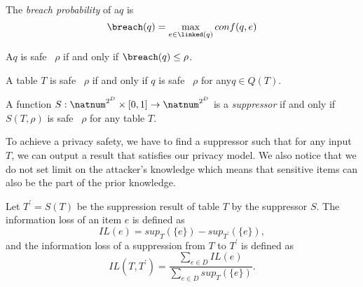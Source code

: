 \begin{definition}
\label{def:probability} The \emph{breach probability} of a\qid $q$ is \[
\breach(q) = \max_{e\in\linked(q)} conf(q,e) \]
\end{definition}

\begin{definition}%
\label{def:safety_qid}
A\qid $q$ is safe \wrt~$\rho$ if and only if $\breach(q)\leq\rho$.
\end{definition}

\begin{definition}%
\label{def:safety_table}
A table $T$ is safe \wrt~$\rho$ if and only if $q$ is safe \wrt~$\rho$ for any\qid $q\in Q(T)$.
\end{definition}

\begin{definition}[Suppressor]
\label{def:suppressor}
A function $S : \natnum^{2^D}\times[0,1]\rightarrow\natnum^{2^D}$ is a \emph{suppressor} if and only if $S(T,\rho)$ is safe \wrt~$\rho$ for any table $T$.
\end{definition}

To achieve a privacy safety, we have to find a suppressor such that for any input $T$, we can output a result
that satisfies our privacy model. We also notice that we do not set limit on the attacker's knowledge which means that
 sensitive items can also be the part of the prior knowledge.
 
 


\begin{definition}
\label{def:infoloss}
Let $T^\prime = S(T)$ be the suppression result of table $T$ by the suppressor $S$.
The information loss of an item $e$ is defined as
\[ IL(e) = sup_{T}(\{e\}) - sup_{T^\prime}(\{e\}), \]
and the information loss of a suppression from $T$ to $T^\prime$ is defined as
\[ IL(T,T^\prime) = \frac{\sum_{e\in D}IL(e)}{\sum_{e\in D}sup_{T}(\{e\})}. \]
\end{definition}

